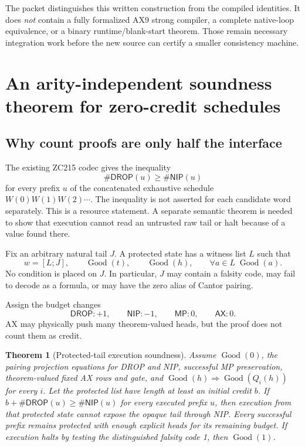 \documentclass[11pt]{article}
\newtheorem{theorem}{Theorem}[section]
\newcommand{\Good}{\operatorname{Good}}
\newcommand{\AX}{\mathsf{AX}}
\newcommand{\DROP}{\mathsf{DROP}}
\newcommand{\NIP}{\mathsf{NIP}}
\newcommand{\MP}{\mathsf{MP}}
\begin{document}
The packet distinguishes this written construction from the compiled identities. It does \emph{not} contain a fully formalized AX9 strong compiler, a complete native-loop equivalence, or a binary runtime/blank-start theorem. Those remain necessary integration work before the new source can certify a smaller consistency machine.

\section{An arity-independent soundness theorem for zero-credit schedules}

\subsection{Why count proofs are only half the interface}

The existing ZC215 codec gives the inequality
\[
 \#\DROP(u)\ge\#\NIP(u)
\]
for every prefix $u$ of the concatenated exhaustive schedule $W(0)W(1)W(2)\cdots$. The inequality is not asserted for each candidate word separately. This is a resource statement. A separate semantic theorem is needed to show that execution cannot read an untrusted raw tail or halt because of a value found there.

Fix an arbitrary natural tail $J$. A protected state has a witness list $L$ such that
\[
 w=[L;J],\qquad \Good(t),\qquad\Good(h),\qquad
 \forall a\in L\;\Good(a).
\]
No condition is placed on $J$. In particular, $J$ may contain a falsity code, may fail to decode as a formula, or may have the zero alias of Cantor pairing.

Assign the budget changes
\[
 \DROP:+1,\qquad\NIP:-1,\qquad\MP:0,\qquad\AX:0.
\]
AX may physically push many theorem-valued heads, but the proof does not count them as credit.

\begin{theorem}[Protected-tail execution soundness]
Assume $\Good(0)$, the pairing projection equations for DROP and NIP, successful MP preservation, theorem-valued fixed AX rows and gate, and $\Good(h)\Rightarrow\Good(Q_i(h))$ for every $i$. Let the protected list have length at least an initial credit $b$. If $b+\#\DROP(u)\ge\#\NIP(u)$ for every executed prefix $u$, then execution from that protected state cannot expose the opaque tail through NIP. Every successful prefix remains protected with enough explicit heads for its remaining budget. If execution halts by testing the distinguished falsity code 1, then $\Good(1)$.
\end{theorem}
\end{document}
